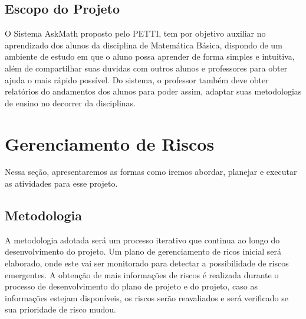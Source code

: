 \begin{table}[H]
\centering
\caption{Nescessidades do Cliente}
\label{table_nescessidades_cliente}
\end{table}

\subsection{Escopo do Projeto}
O Sistema AskMath proposto pelo PETTI, tem por objetivo auxiliar no aprendizado 
dos alunos da disciplina de Matemática Básica, dispondo de um ambiente de estudo 
em que o aluno possa aprender de forma simples e intuitiva, além de compartilhar 
suas duvidas com outros alunos e professores para obter ajuda o mais rápido 
possível. Do sistema, o professor também deve obter relatórios do andamentos dos 
alunos para poder assim, adaptar suas metodologias de ensino no decorrer da 
disciplinas.

\section{Gerenciamento de Riscos}
Nessa seção, apresentaremos as formas como iremos abordar, planejar e executar 
as atividades para esse projeto.

\subsection{Metodologia}

A metodologia adotada será um processo iterativo que continua ao longo do 
desenvolvimento do projeto. Um plano de gerenciamento de ricos inicial será 
elaborado, onde este vai ser monitorado para detectar a possibilidade de riscos 
emergentes. A obtenção de mais informações de riscos é realizada durante o 
processo de desenvolvimento do plano de projeto e do projeto, caso as 
informações estejam disponíveis, os riscos serão reavaliados e será verificado 
se sua prioridade de risco mudou.

